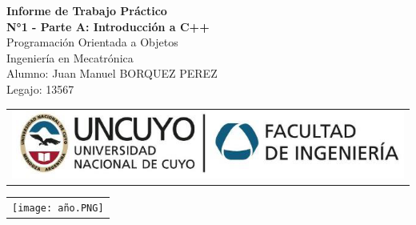 \documentclass[a4paper,12pt]{article}
\begin{document}
\begin{titlepage}
    \centering
    \vspace*{5cm}
    {\Huge\bfseries Informe de Trabajo Práctico}\\
    \vspace{0.2cm}
    {\Large \textbf{N°1 - Parte A: Introducción a C++}}\\
    \vspace{0.5cm}
    {\Large Programación Orientada a Objetos}\\
    \vspace{0.2 cm}
    {\Large Ingeniería en Mecatrónica}\\
    \vspace{1.5cm}
    Alumno: Juan Manuel BORQUEZ PEREZ\\
    Legajo: 13567\\
    \vfill
    {\begin{tabular}{@{}c@{}}\includegraphics[scale=0.4]{escudo.PNG}\end{tabular}}\hspace{10pt}
    {\begin{tabular}{@{}c@{}}\texttt{[image: año.PNG]}\end{tabular}}
\end{titlepage}
\end{document}
